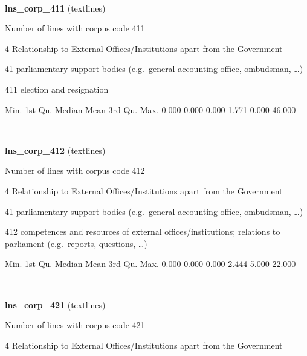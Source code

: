 \documentclass[]{article}
\newenvironment{Shaded}{\begin{snugshade}}{\end{snugshade}}
\newcommand{\FloatTok}[1]{\textcolor[rgb]{0.00,0.00,0.81}{{#1}}}
\newcommand{\NormalTok}[1]{{#1}}
\begin{document}
~

\vspace{1em}

\textbf{lns\_corp\_411} (textlines)

Number of lines with corpus code 411

4 Relationship to External Offices/Institutions apart from the
Government

41 parliamentary support bodies (e.g.~general accounting office,
ombudsman, \ldots{})

411 election and resignation

\begin{Shaded}
\begin{Highlighting}[]
   \NormalTok{Min. 1st Qu.  Median    Mean 3rd Qu.    Max. }
  \FloatTok{0.000}   \FloatTok{0.000}   \FloatTok{0.000}   \FloatTok{1.771}   \FloatTok{0.000}  \FloatTok{46.000} 
\end{Highlighting}
\end{Shaded}

~

\vspace{1em}

\textbf{lns\_corp\_412} (textlines)

Number of lines with corpus code 412

4 Relationship to External Offices/Institutions apart from the
Government

41 parliamentary support bodies (e.g.~general accounting office,
ombudsman, \ldots{})

412 competences and resources of external offices/institutions;
relations to parliament (e.g.~reports, questions, \ldots{})

\begin{Shaded}
\begin{Highlighting}[]
   \NormalTok{Min. 1st Qu.  Median    Mean 3rd Qu.    Max. }
  \FloatTok{0.000}   \FloatTok{0.000}   \FloatTok{0.000}   \FloatTok{2.444}   \FloatTok{5.000}  \FloatTok{22.000} 
\end{Highlighting}
\end{Shaded}

~

\vspace{1em}

\textbf{lns\_corp\_421} (textlines)

Number of lines with corpus code 421

4 Relationship to External Offices/Institutions apart from the
Government
\end{document}
